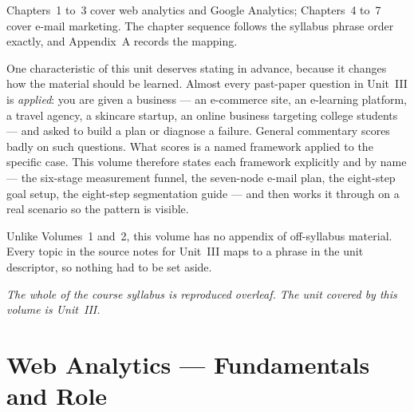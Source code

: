 \documentclass{MMTextbook}
\begin{document}
Chapters~1 to~3 cover web analytics and Google Analytics; Chapters~4 to~7 cover
e-mail marketing. The chapter sequence follows the syllabus phrase order exactly,
and Appendix~A records the mapping.

One characteristic of this unit deserves stating in advance, because it changes
how the material should be learned. Almost every past-paper question in Unit~III
is \emph{applied}: you are given a business --- an e-commerce site, an e-learning
platform, a travel agency, a skincare startup, an online business targeting
college students --- and asked to build a plan or diagnose a failure. General
commentary scores badly on such questions. What scores is a named framework
applied to the specific case. This volume therefore states each framework
explicitly and by name --- the six-stage measurement funnel, the seven-node
e-mail plan, the eight-step goal setup, the eight-step segmentation guide --- and
then works it through on a real scenario so the pattern is visible.

Unlike Volumes~1 and~2, this volume has no appendix of off-syllabus material.
Every topic in the source notes for Unit~III maps to a phrase in the unit
descriptor, so nothing had to be set aside.

\vspace{12pt}
\noindent\emph{The whole of the course syllabus is reproduced overleaf. The
unit covered by this volume is Unit~III.}




\cleardoublepage
{}
\tableofcontents
\cleardoublepage
\listoffigures
\cleardoublepage
\listoftables

\mainmatter
\pagestyle{mmmain}

\chapter{Web Analytics --- Fundamentals and Role}

\end{document}
